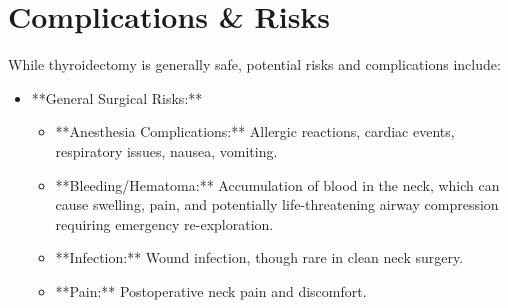 \section*{Complications \& Risks}
While thyroidectomy is generally safe, potential risks and complications include:

\begin{itemize}
  \item **General Surgical Risks:**
    \begin{itemize}
      \item **Anesthesia Complications:** Allergic reactions, cardiac events, respiratory issues, nausea, vomiting.
      \item **Bleeding/Hematoma:** Accumulation of blood in the neck, which can cause swelling, pain, and potentially life-threatening airway compression requiring emergency re-exploration.
      \item **Infection:** Wound infection, though rare in clean neck surgery.
      \item **Pain:** Postoperative neck pain and discomfort.
    \end{itemize}
  

\end{itemize}
